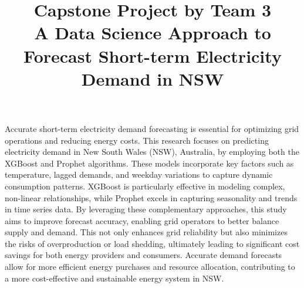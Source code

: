 \documentclass[mstat,12pt]{unswthesis}
\title{Capstone Project by Team 3\\[0.5cm]A Data Science Approach to
Forecast Short-term Electricity Demand in NSW}
\author{\Authornameonly}
\begin{document}
\beforepreface

















Accurate short-term electricity demand forecasting is essential for
optimizing grid operations and reducing energy costs. This research
focuses on predicting electricity demand in New South Wales (NSW),
Australia, by employing both the XGBoost and Prophet algorithms. These
models incorporate key factors such as temperature, lagged demands, and
weekday variations to capture dynamic consumption patterns. XGBoost is
particularly effective in modeling complex, non-linear relationships,
while Prophet excels in capturing seasonality and trends in time series
data. By leveraging these complementary approaches, this study aims to
improve forecast accuracy, enabling grid operators to better balance
supply and demand. This not only enhances grid reliability but also
minimizes the risks of overproduction or load shedding, ultimately
leading to significant cost savings for both energy providers and
consumers. Accurate demand forecasts allow for more efficient energy
purchases and resource allocation, contributing to a more cost-effective
and sustainable energy system in NSW.
\end{document}
